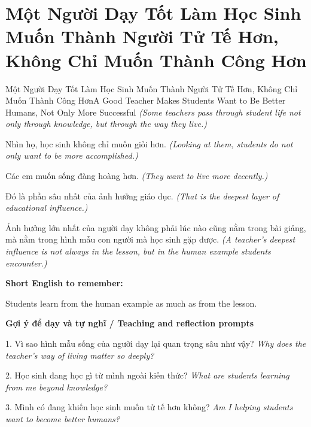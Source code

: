 \section{Một Người Dạy Tốt Làm Học Sinh Muốn Thành Người Tử Tế Hơn, Không Chỉ Muốn Thành Công Hơn}
\begin{truyen}{Một Người Dạy Tốt Làm Học Sinh Muốn Thành Người Tử Tế Hơn, Không Chỉ Muốn Thành Công Hơn}{A Good Teacher Makes Students Want to Be Better Humans, Not Only More Successful}
\textit{(Some teachers pass through student life not only through knowledge, but through the way they live.)}

Nhìn họ, học sinh không chỉ muốn giỏi hơn.
\textit{(Looking at them, students do not only want to be more accomplished.)}

Các em muốn sống đàng hoàng hơn.
\textit{(They want to live more decently.)}

Đó là phần sâu nhất của ảnh hưởng giáo dục.
\textit{(That is the deepest layer of educational influence.)}

\end{truyen}

\begin{baihoc}
Ảnh hưởng lớn nhất của người dạy không phải lúc nào cũng nằm trong bài giảng, mà nằm trong hình mẫu con người mà học sinh gặp được.
\textit{(A teacher's deepest influence is not always in the lesson, but in the human example students encounter.)}
\end{baihoc}

\begin{ghinhoanh}
\textbf{Short English to remember:}

Students learn from the human example as much as from the lesson.

\end{ghinhoanh}

\begin{tuhocnhanh}
\textbf{Gợi ý để dạy và tự nghĩ / Teaching and reflection prompts}

1. Vì sao hình mẫu sống của người dạy lại quan trọng sâu như vậy? \textit{Why does the teacher's way of living matter so deeply?}

2. Học sinh đang học gì từ mình ngoài kiến thức? \textit{What are students learning from me beyond knowledge?}

3. Mình có đang khiến học sinh muốn tử tế hơn không? \textit{Am I helping students want to become better humans?}
\end{tuhocnhanh}
\ngancach

